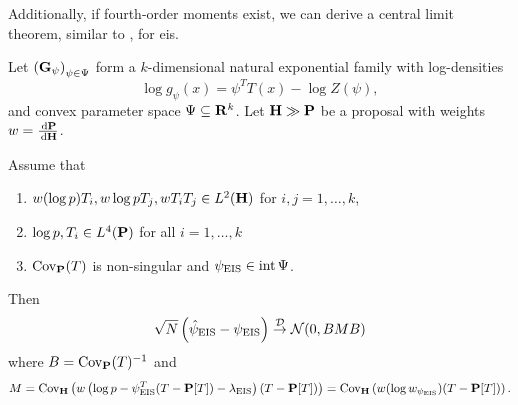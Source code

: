 Additionally, if fourth-order moments exist, we can derive a central limit theorem, similar to , for \gls{eis}.

\begin{theorem}
    \label{thm:eis-clt}
    Let $\left( \G_{\psi} \right)_{\psi \in \Psi}$ form a $k$-dimensional natural exponential family with log-densities 
    $$
    \log g_{\psi}(x) = \psi^{T} T(x) - \log Z(\psi),
    $$
    and convex parameter space $\Psi \subseteq \R^{k}$. Let $\H \gg \P$ be a proposal with weights $w = \rnd{\P}{\H}$. 

    Assume that
    \begin{enumerate}
        \item\label{it:secondISmomentsexist}$w (\log p)T_{i}, w\log p T_{j}, w T_{i}T_{j} \in L^{2}(\H)$ for $i,j = 1, \dots, k$,
        \item\label{it:fourthmomentsexist} $\log p, T_i \in L^{4}(\P)$ for all $i = 1, \dots, k$
        \item $\cov_{\P}(T)$ is non-singular and $\peis \in \operatorname{int} \Psi$.
    \end{enumerate}

    Then 
    $$
        \sqrt{N} \left(\hpeis - \peis\right) \convD \Normal (0, BMB)
    $$
    where $B = \cov_{\P}(T)^{-1}$ and 
    $$
    M = \cov_{\H} \left( w \left( \log p - \psi_{\eis}^{T}(T - \P[T]) - \lambda_{\eis} \right)(T - \P[T]) \right) = \cov_{\H} \left( w (\log w_{\psi_{\eis}}) (T - \P[T]) \right).
    $$
\end{theorem}

